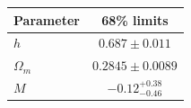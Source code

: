 \begin{tabular} { l  c}

 Parameter &  68\% limits\\
\hline
{\boldmath$h              $} & $0.687\pm 0.011            $\\

{\boldmath$Ω_m            $} & $0.2845\pm 0.0089          $\\

{\boldmath$M              $} & $-0.12^{+0.38}_{-0.46}     $\\
\hline
\end{tabular}